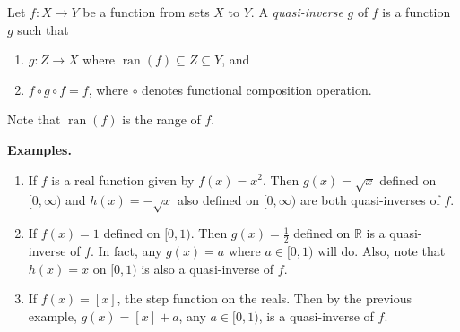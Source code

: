 \documentclass[12pt]{article}
\begin{document}
Let $f:X\to Y$ be a function from sets $X$ to $Y$.  A \emph{quasi-inverse} $g$ of $f$ is a function $g$ such that 
\begin{enumerate}
\item $g:Z\to X$ where $\operatorname{ran}(f)\subseteq Z\subseteq Y$, and
\item $f\circ g\circ f=f$, where $\circ$ denotes functional composition operation.
\end{enumerate}

Note that $\operatorname{ran}(f)$ is the range of $f$.

\textbf{Examples.}
\begin{enumerate}
\item If $f$ is a real function given by $f(x)=x^2$.  Then $g(x)=\sqrt{x}$ defined on $[0,\infty)$ and $h(x)=-\sqrt{x}$ also defined on $[0,\infty)$ are both quasi-inverses of $f$.
\item If $f(x)=1$ defined on $[0,1)$.  Then $g(x)=\frac{1}{2}$ defined on $\mathbb{R}$ is a quasi-inverse of $f$.  In fact, any $g(x)=a$ where $a\in [0,1)$ will do.  Also, note that $h(x)=x$ on $[0,1)$ is also a quasi-inverse of $f$.
\item If $f(x)=[x]$, the step function on the reals.  Then by the previous example, $g(x)=[x]+a$, any $a\in[0,1)$, is a quasi-inverse of $f$. 
\end{enumerate}
\end{document}
